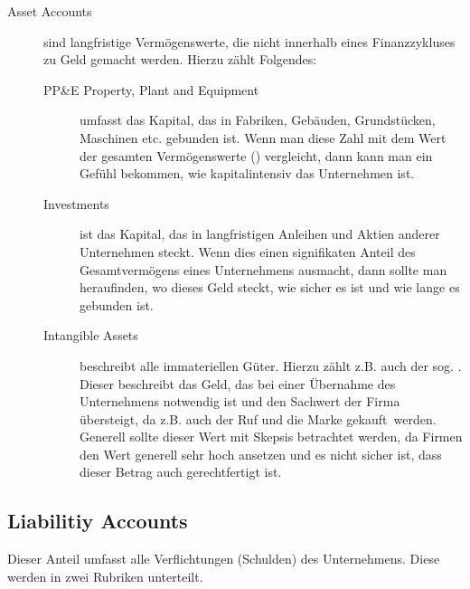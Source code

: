 \begin{description}
\begin{description}
\begin{formel}
                \end{formel}
        \end{description}
    \item[Asset Accounts] sind langfristige Vermögenswerte, die nicht innerhalb eines Finanzzykluses zu Geld gemacht werden.
        Hierzu zählt Folgendes:
        \begin{description}
            \item[PP\&E Property, Plant and Equipment] umfasst das Kapital, das in Fabriken, Gebäuden, Grundstücken, Maschinen etc. gebunden ist.
                Wenn man diese Zahl mit dem Wert der gesamten Vermögenswerte () vergleicht, dann kann man ein Gefühl bekommen, wie kapitalintensiv das Unternehmen ist. 
            \item[Investments] ist das Kapital, das in langfristigen Anleihen und Aktien anderer Unternehmen steckt.
                Wenn dies einen signifikaten Anteil des Gesamtvermögens eines Unternehmens ausmacht, dann sollte man heraufinden, wo dieses Geld steckt, wie sicher es ist und wie lange es gebunden ist. 
            \item[Intangible Assets] beschreibt alle immateriellen Güter. Hierzu zählt z.B. auch der sog. . 
                Dieser beschreibt das Geld, das bei einer Übernahme des Unternehmens notwendig ist und den Sachwert der Firma übersteigt, da z.B. auch der Ruf und die Marke \glqq gekauft\grqq\ werden.   
                Generell sollte dieser Wert mit Skepsis betrachtet werden, da Firmen den Wert generell sehr hoch ansetzen und es nicht sicher ist, dass dieser Betrag auch gerechtfertigt ist.
        \end{description}
\end{description}

%
\subsection{Liabilitiy Accounts}

Dieser Anteil umfasst alle Verflichtungen (Schulden) des Unternehmens.
Diese werden in zwei Rubriken unterteilt.


